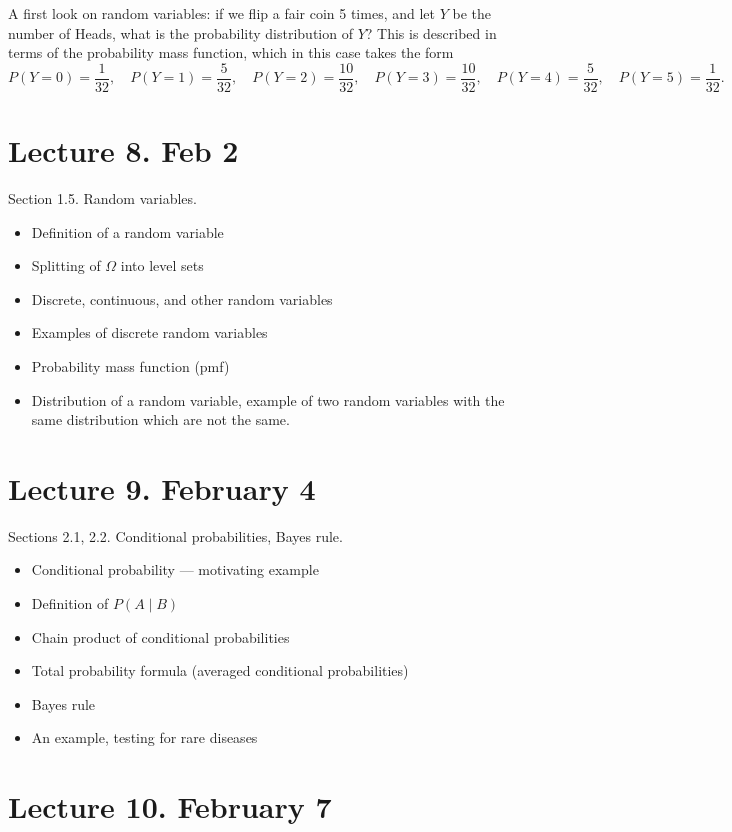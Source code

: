\documentclass[letterpaper,11pt,oneside,reqno]{amsart}
\numberwithin{equation}{section}
\theoremstyle{definition}
\begin{document}
A first look on random variables: if we flip a fair coin 5 times, and let $Y$ be the number of Heads, 
what is the probability distribution of $Y$? This is described in terms of the probability mass function,
which in this case takes the form
\begin{equation*}
	P(Y=0)=\frac{1}{32},\quad
	P(Y=1)=\frac{5}{32},\quad
	P(Y=2)=\frac{10}{32},\quad
	P(Y=3)=\frac{10}{32},\quad
	P(Y=4)=\frac{5}{32},\quad
	P(Y=5)=\frac{1}{32}.
\end{equation*}

\section*{Lecture 8. Feb 2}

Section 1.5. Random variables. 
\begin{itemize}
	\item Definition of a random variable
	\item Splitting of $\Omega$ into level sets
	\item Discrete, continuous, and other random variables
	\item Examples of discrete random variables
	\item Probability mass function (pmf)
	\item Distribution of a random variable, example of 
		two random variables with the same distribution
		which are not the same.
\end{itemize}

\section*{Lecture 9. February 4}

Sections 2.1, 2.2. Conditional probabilities, Bayes rule.

\begin{itemize}
	\item Conditional probability --- motivating example
	\item Definition of $P(A\mid B)$
	\item Chain product of conditional probabilities
	\item Total probability formula (averaged conditional probabilities)
	\item Bayes rule
	\item An example, testing for rare diseases
\end{itemize}


\section*{Lecture 10. February 7}
\end{document}
